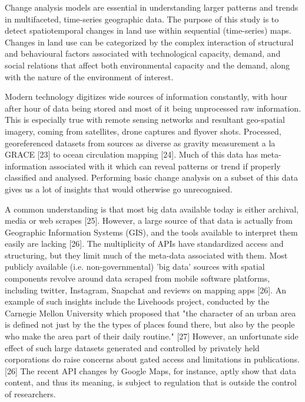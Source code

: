 \documentclass[conference]{IEEEtran}
\begin{document}
Change analysis models are essential in understanding larger patterns and trends in multifaceted, time-series geographic data. The purpose of this study is to detect spatiotemporal changes in land use within sequential (time-series) maps. Changes in land use can be categorized by the complex interaction of structural and behavioural factors associated with technological capacity, demand, and social relations that affect both environmental capacity and the demand, along with the nature of the environment of interest.

Modern technology digitizes wide sources of information constantly, with hour after hour of data being stored and most of it being unprocessed raw information. This is especially true with remote sensing networks and resultant geo-spatial imagery, coming from satellites, drone captures and flyover shots. Processed, georeferenced datasets from sources as diverse as gravity measurement a la GRACE [23] to ocean circulation mapping [24]. Much of this data has meta-information associated with it which can reveal patterns or trend if properly classified and analysed. Performing basic change analysis on a subset of this data gives us a lot of insights that would otherwise go unrecognised.

A common understanding is that most big data available today is either archival, media or web scrapes [25]. However, a large source of that data is actually from Geographic Information Systems (GIS), and the tools available to interpret them easily are lacking [26]. The multiplicity of APIs have standardized access and structuring, but they limit much of the meta-data associated with them. Most publicly available (i.e. non-governmental) 'big data' sources with spatial components revolve around data scraped from mobile software platforms, including twitter, Instagram, Snapchat and reviews on mapping apps [26]. An example of such insights include the Livehoods project, conducted by the Carnegie Mellon University which proposed that "the character of an urban area is defined not just by the the types of places found there, but also by the people who make the area part of their daily routine." [27] However, an unfortunate side effect of such large datasets generated and controlled by privately held corporations do raise concerns about gated access and limitations in publications. [26] The recent API changes by Google Maps, for instance, aptly show that data content, and thus its meaning, is subject to regulation that is outside the control of researchers.
 
\end{document}
